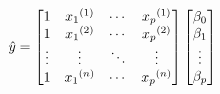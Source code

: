 \documentclass[preview]{standalone}
\begin{document}
\begin{align*}
\special{dvisvgm:raw <g id='unique000'>}\hat{y}=\begin{bmatrix}1&{x_1}^{(1)}&\cdots&{x_p}^{(1)}\\1&{x_1}^{(2)}&\cdots&{x_p}^{(2)}\\\vdots&\vdots&\ddots&\vdots\\1&{x_1}^{(n)}&\cdots&{x_p}^{(n)}\end{bmatrix}\begin{bmatrix}\beta_0\\\beta_1\\\vdots\\\beta_p\end{bmatrix}\special{dvisvgm:raw </g>}
\end{align*}
\end{document}
